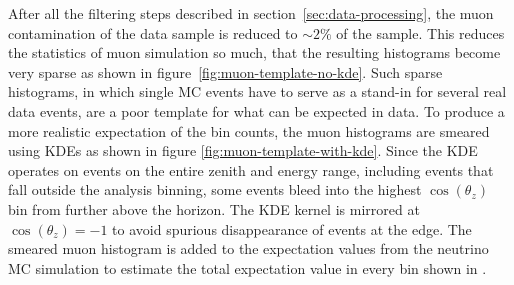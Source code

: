 After all the filtering steps described in section~\ref{sec:data-processing}, the muon contamination of the data sample is reduced to $\sim 2\%$ of the sample. This reduces the statistics of muon simulation so much, that the resulting histograms become very sparse as shown in figure~\ref{fig:muon-template-no-kde}. Such sparse histograms, in which single MC events have to serve as a stand-in for several real data events, are a poor template for what can be expected in data. To produce a more realistic expectation of the bin counts, the muon histograms are smeared using KDEs as shown in figure \ref{fig:muon-template-with-kde}. Since the KDE operates on events on the entire zenith and energy range, including events that fall outside the analysis binning, some events bleed into the highest $\cos(\theta_z)$ bin from further above the horizon. The KDE kernel is mirrored at $\cos(\theta_z) = -1$ to avoid spurious disappearance of events at the edge. The smeared muon histogram is added to the expectation values from the neutrino MC simulation to estimate the total expectation value in every bin shown in .

